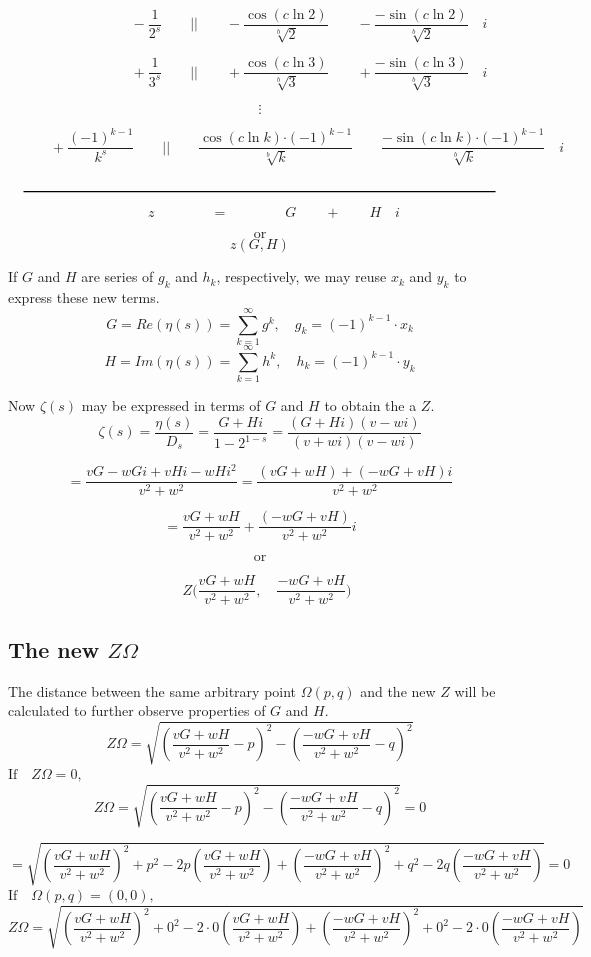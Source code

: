 \documentclass{amsart}
\begin{document}
	\[ \quad \qquad  \qquad \qquad -\frac{1}{2^s} \qquad \Big|\Big|  \qquad -\frac{\cos({c\ln 2})}{\sqrt[b]{2}} \qquad -\frac{-\sin({c\ln 2})}{\sqrt[b]{2}} \quad i  \]
	
	\[ \quad \qquad  \qquad \qquad +\frac{1}{3^s} \qquad \Big|\Big|  \qquad +\frac{\cos({c\ln 3})}{\sqrt[b]{3}} \qquad +\frac{-\sin({c\ln 3})}{\sqrt[b]{3}} \quad i  \]
	
	\[ \vdots \]
	
	\[ \qquad  \quad +\frac{(-1)^{k-1}}{k^s} \qquad \Big|\Big|  \qquad \frac{\cos({c\ln k}){\cdot(-1)^{k-1}}}{\sqrt[b]{k}} \qquad \frac{{-}\sin({c\ln k}){\cdot({-}1)^{k-1}}}{\sqrt[b]{k}} \quad i  \]
	
	\[\quad \rule{12 cm}{.8pt} \quad \]
	\[ \qquad \qquad \qquad z \qquad\qquad =  \qquad\qquad G \qquad + \qquad H \quad i \qquad\qquad \]
	
	\[ \text{or} \]
	\[ z (G, H) \]
	\[\]
	
	If $G$ and $H$ are series of $g_k$ and $h_k$, respectively, we may reuse $x_k$ and $y_k$ to express these new terms.
	\[ G = Re(\eta(s)) = \sum\limits_{k=1}^{\infty}g^k, \quad g_k = (-1)^{k-1} \cdot x_k \]
	\[ H = Im(\eta(s)) = \sum\limits_{k=1}^{\infty}h^k, \quad h_k = (-1)^{k-1} \cdot y_k \]
	
	Now $\zeta(s)$ may be expressed in terms of $G$ and $H$ to obtain the a $Z$.
	\[ \zeta(s) = \frac{\eta(s)}{D_{s}} = \frac{G + Hi}{1-2^{1-s}} = \frac{(G+Hi)(v-wi)}{(v+wi)(v-wi)} \]
	
	\[ = \frac{vG-wGi+vHi-wHi^2}{v^2+w^2} = \frac{(vG+wH)+(-wG+vH)i}{v^2+w^2} \]
	
	\[ = \frac{vG+wH}{v^2+w^2} + \frac{(-wG+vH)}{v^2+w^2}i \]
	
	\[ \text{or} \]
	
	\[ \quad Z\biggr(\frac{vG+wH}{v^2+w^2}, \quad \frac{-wG+vH}{v^2+w^2}\biggl) \]
	
	\subsection{The new $Z\Omega$}
	The distance between the same arbitrary point $\Omega(p, q)$ and the new $Z$ will be calculated to further observe properties of $G$ and $H$.
	\[ Z\Omega = \sqrt{(\frac{vG+wH}{v^2+w^2}-p)^2 - (\frac{-wG+vH}{v^2+w^2}-q)^2} \]
	\[\]
	$ \text{If} \quad Z\Omega = 0, $
	\[ Z\Omega = \sqrt{(\frac{vG+wH}{v^2+w^2}-p)^2 - (\frac{-wG+vH}{v^2+w^2}-q)^2} = 0 \]
	
	\[ = \sqrt{  (\frac{vG{+}wH}{v^2{+}w^2})^2 {+} p^2 {-} 2p(\frac{vG{+}wH}{v^2{+}w^2}) {+} (\frac{-wG{+}vH}{v^2{+}w^2})^2 {+} q^2 {-}2q(\frac{-wG{+}vH}{v^2{+}w^2}) } = 0 \]
	\[\]
	\[\]
	$ \text{If} \quad \Omega(p, q) = (0, 0), $
	\[ Z\Omega = \sqrt{  (\frac{vG{+}wH}{v^2{+}w^2})^2 {+} 0^2 {-} 2 {\cdot} 0 (\frac{vG{+}wH}{v^2{+}w^2}) {+} (\frac{-wG{+}vH}{v^2{+}w^2})^2 {+} 0^2 {-} 2 {\cdot} 0 (\frac{-wG{+}vH}{v^2{+}w^2}) } \]
	
\end{document}
